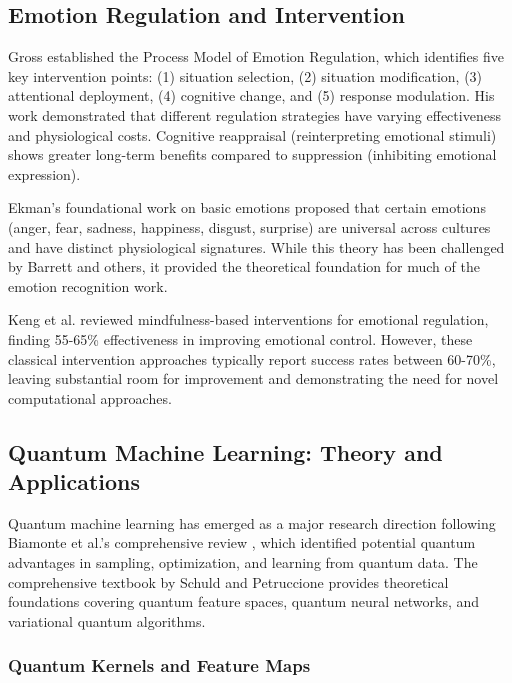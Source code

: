 \documentclass[11pt,letterpaper]{article}
\begin{document}
\subsection{Emotion Regulation and Intervention}

Gross \cite{gross1998antecedent} established the Process Model of Emotion Regulation, which identifies five key intervention points: (1) situation selection, (2) situation modification, (3) attentional deployment, (4) cognitive change, and (5) response modulation. His work demonstrated that different regulation strategies have varying effectiveness and physiological costs. Cognitive reappraisal (reinterpreting emotional stimuli) shows greater long-term benefits compared to suppression (inhibiting emotional expression).

Ekman's foundational work \cite{ekman1992argument} on basic emotions proposed that certain emotions (anger, fear, sadness, happiness, disgust, surprise) are universal across cultures and have distinct physiological signatures. While this theory has been challenged by Barrett and others, it provided the theoretical foundation for much of the emotion recognition work.

Keng et al. \cite{keng2011effect} reviewed mindfulness-based interventions for emotional regulation, finding 55-65\% effectiveness in improving emotional control. However, these classical intervention approaches typically report success rates between 60-70\%, leaving substantial room for improvement and demonstrating the need for novel computational approaches.

\subsection{Quantum Machine Learning: Theory and Applications}

Quantum machine learning has emerged as a major research direction following Biamonte et al.'s comprehensive review \cite{biamonte2017quantum}, which identified potential quantum advantages in sampling, optimization, and learning from quantum data. The comprehensive textbook by Schuld and Petruccione \cite{schuld2021machine} provides theoretical foundations covering quantum feature spaces, quantum neural networks, and variational quantum algorithms.

\subsubsection{Quantum Kernels and Feature Maps}
\end{document}
